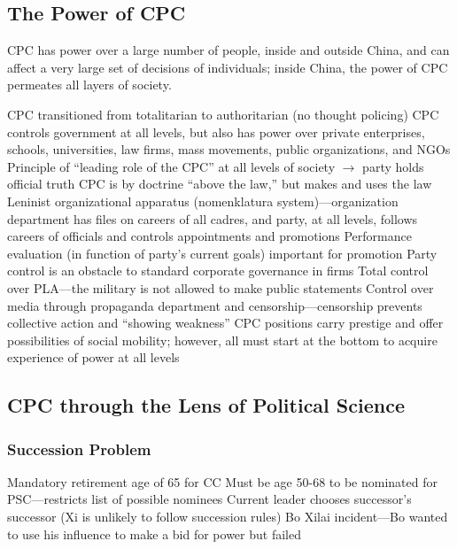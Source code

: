 \documentclass[11pt]{article}
\theoremstyle{definition}
\theoremstyle{remark}
\begin{document}
\subsection{The Power of CPC}
CPC has power over a large number of people, inside and outside China, and can affect a very large set of decisions of individuals; inside China, the power of CPC permeates all layers of society.
\begin{outline}[enumerate]
\1 CPC transitioned from totalitarian to authoritarian (no thought policing)
\1 CPC controls government at all levels, but also has power over private enterprises, schools, universities, law firms, mass movements, public organizations, and NGOs
	\2 Principle of ``leading role of the CPC'' at all levels of society $\to$ party holds official truth
	\2 CPC is by doctrine ``above the law,'' but makes and uses the law
	\2 Leninist organizational apparatus (nomenklatura system)---organization department has files on careers of all cadres, and party, at all levels, follows careers of officials and controls appointments and promotions
		\3 Performance evaluation (in function of party's current goals) important for promotion
		\3 Party control is an obstacle to standard corporate governance in firms
\1 Total control over PLA---the military is not allowed to make public statements
\1 Control over media through propaganda department and censorship---censorship prevents collective action and ``showing weakness''
\1 CPC positions carry prestige and offer possibilities of social mobility; however, all must start at the bottom to acquire experience of power at all levels
\end{outline}


\subsection{CPC through the Lens of Political Science}
\subsubsection{Succession Problem}
\begin{outline}[enumerate]
\1 Mandatory retirement age of 65 for CC
\1 Must be age 50-68 to be nominated for PSC---restricts list of possible nominees
\1 Current leader chooses successor's successor (Xi is unlikely to follow succession rules)
\1 Bo Xilai incident---Bo wanted to use his influence to make a bid for power but failed
\end{outline}
\end{document}
